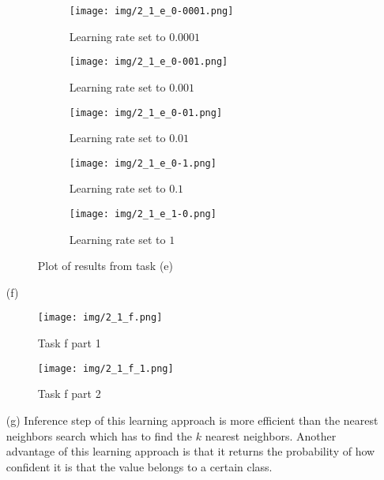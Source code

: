 \documentclass [a4paper, 11pt] {article}
\begin{document}
\begin{enumerate}
\begin{figure}[!h]
	\centering
	\begin{subfigure}{0.4\textwidth}
		\centering
		\texttt{[image: img/2\_1\_e\_0-0001.png]}
		\caption{Learning rate set to $0.0001$}
		\label{fig:2a}
	\end{subfigure}
	\begin{subfigure}{0.4\textwidth}
		\centering
		\texttt{[image: img/2\_1\_e\_0-001.png]}
		\caption{Learning rate set to $0.001$}
		\label{fig:2b}
	\end{subfigure}
	\begin{subfigure}{0.4\textwidth}
		\centering
		\texttt{[image: img/2\_1\_e\_0-01.png]}
		\caption{Learning rate set to $0.01$}
		\label{fig:2c}
	\end{subfigure}
	\begin{subfigure}{0.4\textwidth}
		\centering
		\texttt{[image: img/2\_1\_e\_0-1.png]}
		\caption{Learning rate set to $0.1$}
		\label{fig:2d}
	\end{subfigure}
	\begin{subfigure}{0.4\textwidth}
		\centering
		\texttt{[image: img/2\_1\_e\_1-0.png]}
		\caption{Learning rate set to $1$}
		\label{fig:2e}
	\end{subfigure}
	\caption{Plot of results from task (e)}
	\label{fig:2}
\end{figure}

\item[(f)]
\begin{figure}[!h]
	\centering
	\texttt{[image: img/2\_1\_f.png]}
	\caption{Task f part 1}
	\label{fig:task-f}
\end{figure}

\begin{figure}[!h]
	\centering
	\texttt{[image: img/2\_1\_f\_1.png]}
	\caption{Task f part 2}
	\label{fig:task-f-2}
\end{figure}


\item[(g)]
Inference step of this learning approach is more efficient than the nearest neighbors search which has to find the $k$ nearest neighbors. Another advantage of this learning approach is that it returns the probability of how confident it is that the value belongs to a certain class.

\end{enumerate}
	
\end{document}
